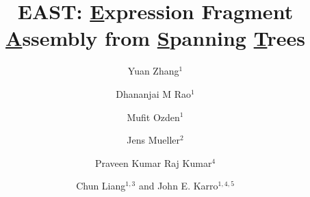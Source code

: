 \documentclass[10pt]{bmc_article}
\newenvironment{bmcformat}{\begin{raggedright}\baselineskip20pt\sloppy\setboolean{publ}{false}}{\end{raggedright}\baselineskip20pt\sloppy}
\begin{document}
\begin{bmcformat}

\title{EAST: {\underline E}xpression Fragment {\underline A}ssembly from {\underline S}panning {\underline T}rees}



\author{Yuan Zhang$^1$
  \and
  Dhananjai M Rao$^1$
  \and
  Mufit Ozden$^1$
  \and
  Jens Mueller$^2$
  \and
  Praveen Kumar Raj Kumar$^4$
  \and
  Chun Liang\correspondingauthor$^{1,3}$
  and
  John E. Karro\correspondingauthor$^{1,4,5}$
}


\address{
  \iid(1)Department of Computer Science and Software Engineering,  \\
  \iid(2)Informational Technology Services\\
  \iid(3)Department of Botanty, \\
  \iid(4)Department of Microbiology, \\
  \iid(5)Department of Statistics, Miami University, Oxford OHIO, USA
}

\maketitle




\end{bmcformat}
\end{document}
